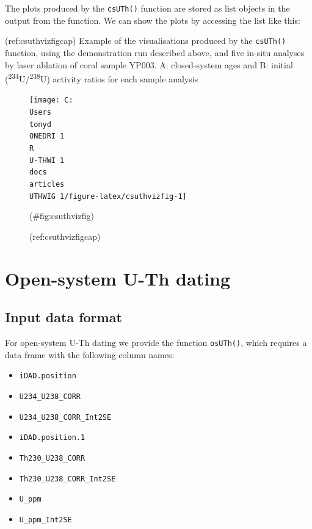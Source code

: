 \documentclass[]{elsarticle} %
\providecommand{\tightlist}{%
  \setlength{\itemsep}{0pt}\setlength{\parskip}{0pt}}
\newenvironment{Shaded}{\begin{snugshade}}{\end{snugshade}}
\newcommand{\NormalTok}[1]{#1}
\newcommand{\OperatorTok}[1]{\textcolor[rgb]{0.81,0.36,0.00}{\textbf{#1}}}
\begin{document}
The plots produced by the \texttt{csUTh()} function are stored as list objects in the output from the function. We can show the plots by accessing the list like this:

(ref:csuthvizfigcap) Example of the visualisations produced by the \texttt{csUTh()} function, using the demonstration run described above, and five in-situ analyses by laser ablation of coral sample YP003. A: closed-system ages and B: initial (\textsuperscript{234}U/\textsuperscript{238}U) activity ratios for each sample analysis

\begin{Shaded}
\end{Shaded}

\begin{figure}
\texttt{[image: C:\\Users\\tonyd\\ONEDRI~1\\R\\U-THWI~1\\docs\\articles\\UTHWIG~1/figure-latex/csuthvizfig-1]} \caption{(ref:csuthvizfigcap)}(\#fig:csuthvizfig)
\end{figure}

\FloatBarrier

\newpage

\hypertarget{open-system-u-th-dating}{%
\section{Open-system U-Th dating}\label{open-system-u-th-dating}}

\hypertarget{input-data-format-1}{%
\subsection{Input data format}\label{input-data-format-1}}

For open-system U-Th dating we provide the function \texttt{osUTh()}, which requires a data frame with the following column names:

\begin{itemize}
\tightlist
\item
  \texttt{iDAD.position}
\item
  \texttt{U234\_U238\_CORR}
\item
  \texttt{U234\_U238\_CORR\_Int2SE}
\item
  \texttt{iDAD.position.1}
\item
  \texttt{Th230\_U238\_CORR}
\item
  \texttt{Th230\_U238\_CORR\_Int2SE}
\item
  \texttt{U\_ppm}
\item
  \texttt{U\_ppm\_Int2SE}
\end{itemize}
\end{document}
